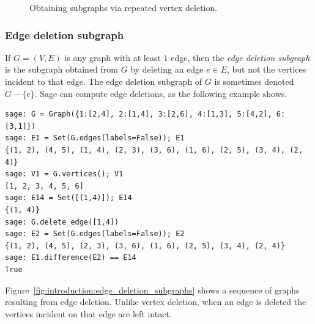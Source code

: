 \begin{figure}[!htbp]
{
}
\caption{Obtaining subgraphs via repeated vertex deletion.}
\label{fig:introduction:vertex_deletion_subgraphs}
\end{figure}



\subsubsection{Edge deletion subgraph}

If $G = (V,E)$ is any graph with at least $1$ edge, then the
\emph{edge deletion subgraph} is the subgraph obtained from $G$ by
deleting an edge $e \in E$, but not the vertices incident to that edge.
The edge deletion subgraph of $G$ is sometimes denoted $G - \{e\}$.
Sage can compute edge deletions, as the following example shows.
%
\begin{lstlisting}
sage: G = Graph({1:[2,4], 2:[1,4], 3:[2,6], 4:[1,3], 5:[4,2], 6:[3,1]})
sage: E1 = Set(G.edges(labels=False)); E1
{(1, 2), (4, 5), (1, 4), (2, 3), (3, 6), (1, 6), (2, 5), (3, 4), (2, 4)}
sage: V1 = G.vertices(); V1
[1, 2, 3, 4, 5, 6]
sage: E14 = Set([(1,4)]); E14
{(1, 4)}
sage: G.delete_edge([1,4])
sage: E2 = Set(G.edges(labels=False)); E2
{(1, 2), (4, 5), (2, 3), (3, 6), (1, 6), (2, 5), (3, 4), (2, 4)}
sage: E1.difference(E2) == E14
True
\end{lstlisting}
%
Figure~\ref{fig:introduction:edge_deletion_subgraphs} shows a sequence
of graphs resulting from edge deletion. Unlike vertex deletion, when
an edge is deleted the vertices incident on that edge are left
intact.

